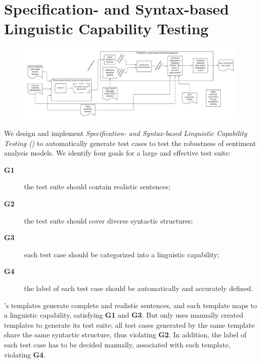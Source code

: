 \section{Specification- and Syntax-based Linguistic Capability Testing}

\begin{figure}
  \centering
  \includegraphics[width=\linewidth]{figs/overview.pdf}
  \caption{\OverviewFigCaption}
\end{figure}

  We design and implement
\emph{Specification- and Syntax-based Linguistic Capability Testing
  (\tool{})} to automatically generate test cases to test the
robustness of sentiment analysis models. We identify four goals for a
large and effective test suite:

\begin{description}
\item[{\bf G1}] the test suite should contain realistic sentences;
\item[{\bf G2}] the test suite should cover diverse syntactic structures;
  \item[{\bf G3}] each test case should be
categorized into a linguistic capability;
\item[{\bf G4}] the label of each test case should be
automatically and accurately defined.
\end{description}

\Chlst's templates generate complete and realistic sentences, and each
template maps to a linguistic capability, satisfying {\bf G1} and {\bf
  G3}. But \Chlst only uses  manually created templates to
generate its test suite; all test cases generated by the same template
share the same syntactic structure, thus violating {\bf G2}. In
addition, the label of each \Chlst test case has to be decided
manually, associated with each template, violating {\bf G4}.

